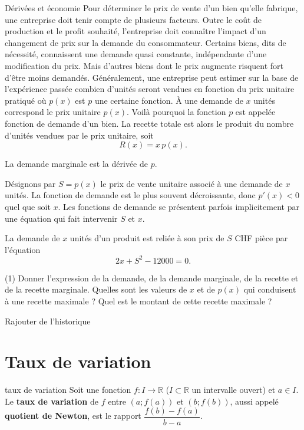 \documentclass[a4paper,12pt]{article}
\begin{document}
\begin{activite}{Dérivées et économie}
Pour déterminer le prix de vente d’un bien qu’elle fabrique, une entreprise doit tenir compte de plusieurs facteurs. Outre le coût de production et le profit souhaité, l’entreprise doit connaître l’impact d’un changement de prix sur la demande du consommateur. Certains biens, dits de nécessité, connaissent une demande quasi constante, indépendante d’une modification du prix. Mais d’autres biens dont le prix augmente risquent fort d’être moins demandés. Généralement, une entreprise peut estimer sur la base de l’expérience passée combien d’unités seront vendues en fonction du prix unitaire pratiqué où \(p(x)\) est \(p\) une certaine fonction. À une demande de \(x\) unités correspond le prix unitaire \(p(x)\). Voilà pourquoi la fonction \(p\) est appelée fonction de demande d’un bien. La recette totale est alors le produit du nombre d’unités vendues par le prix unitaire, soit 
\[
  R(x)=x\,p(x).
\]

La demande marginale est la dérivée de \(p\).

Désignons par \(S=p(x)\) le prix de vente unitaire associé à une demande de \(x\) unités. La fonction de demande est le plus souvent décroissante, donc \(p'(x)<0\) quel que soit \(x\). Les fonctions de demande se présentent parfois implicitement par une équation qui fait intervenir \(S\) et \(x\).

La demande de \(x\) unités d’un produit est reliée à son prix de \(S\) CHF pièce par l’équation
\[
  2x + S^2 - 12000 = 0.
\]

\begin{tasks}(1)
	\task[h)] Donner l’expression de la demande, de la demande marginale, de la recette et de la recette marginale.
	\task[i)] Quelles sont les valeurs de \(x\) et de \(p(x)\) qui conduisent à une recette maximale ?
	\task[j)]  Quel est le montant de cette recette maximale ?
\end{tasks}
\end{activite}
Rajouter de l'historique
\newpage
\section{Taux de variation}
\begin{definition}
	taux de variation
	\tcblower
Soit une fonction $f : I \to \mathbb{R}$ ($I \subset \mathbb{R}$ un intervalle ouvert) et $a \in I$.
Le \textbf{taux de variation} de $f$ entre $(a;f(a))$ et $(b;f(b))$, aussi appelé \textbf{quotient de Newton}, est le rapport $\dfrac{f(b) - f(a)}{b - a}$.
\end{definition}
\end{document}
